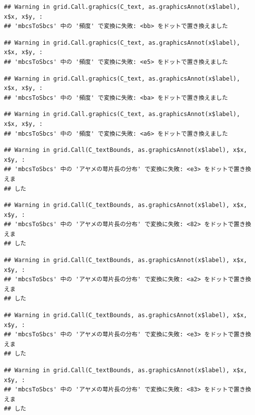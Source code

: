 \documentclass[
]{book}
\begin{document}
\begin{verbatim}
## Warning in grid.Call.graphics(C_text, as.graphicsAnnot(x$label), x$x, x$y, :
## 'mbcsToSbcs' 中の '頻度' で変換に失敗: <bb> をドットで置き換えました
\end{verbatim}

\begin{verbatim}
## Warning in grid.Call.graphics(C_text, as.graphicsAnnot(x$label), x$x, x$y, :
## 'mbcsToSbcs' 中の '頻度' で変換に失敗: <e5> をドットで置き換えました
\end{verbatim}

\begin{verbatim}
## Warning in grid.Call.graphics(C_text, as.graphicsAnnot(x$label), x$x, x$y, :
## 'mbcsToSbcs' 中の '頻度' で変換に失敗: <ba> をドットで置き換えました
\end{verbatim}

\begin{verbatim}
## Warning in grid.Call.graphics(C_text, as.graphicsAnnot(x$label), x$x, x$y, :
## 'mbcsToSbcs' 中の '頻度' で変換に失敗: <a6> をドットで置き換えました
\end{verbatim}

\begin{verbatim}
## Warning in grid.Call(C_textBounds, as.graphicsAnnot(x$label), x$x, x$y, :
## 'mbcsToSbcs' 中の 'アヤメの萼片長の分布' で変換に失敗: <e3> をドットで置き換えま
## した
\end{verbatim}

\begin{verbatim}
## Warning in grid.Call(C_textBounds, as.graphicsAnnot(x$label), x$x, x$y, :
## 'mbcsToSbcs' 中の 'アヤメの萼片長の分布' で変換に失敗: <82> をドットで置き換えま
## した
\end{verbatim}

\begin{verbatim}
## Warning in grid.Call(C_textBounds, as.graphicsAnnot(x$label), x$x, x$y, :
## 'mbcsToSbcs' 中の 'アヤメの萼片長の分布' で変換に失敗: <a2> をドットで置き換えま
## した
\end{verbatim}

\begin{verbatim}
## Warning in grid.Call(C_textBounds, as.graphicsAnnot(x$label), x$x, x$y, :
## 'mbcsToSbcs' 中の 'アヤメの萼片長の分布' で変換に失敗: <e3> をドットで置き換えま
## した
\end{verbatim}

\begin{verbatim}
## Warning in grid.Call(C_textBounds, as.graphicsAnnot(x$label), x$x, x$y, :
## 'mbcsToSbcs' 中の 'アヤメの萼片長の分布' で変換に失敗: <83> をドットで置き換えま
## した
\end{verbatim}
\end{document}
